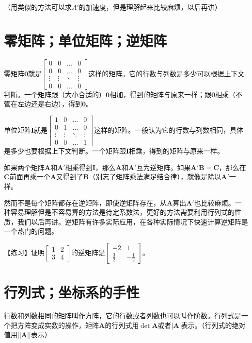 （用类似的方法可以求$A'$的加速度，但是理解起来比较麻烦，以后再讲）
\section{零矩阵；单位矩阵；逆矩阵}
零矩阵$\mathbf{0}$就是$\begin{bmatrix}
0 & 0 & \dots & 0 \\
0 & 0 & \dots & 0 \\
\vdots & \vdots & \ddots & \vdots \\
0 & 0 & \dots & 0
\end{bmatrix}$这样的矩阵。它的行数与列数是多少可以根据上下文判断。一个矩阵跟（大小合适的）$\mathbf{0}$相加，得到的矩阵与原来一样；跟$\mathbf{0}$相乘（不管在左边还是右边），得到$\mathbf{0}$。

单位矩阵$\mathbf{I}$就是$\begin{bmatrix}
1 & 0 & \dots & 0 \\
0 & 1 & \dots & 0 \\
\vdots & \vdots & \ddots & \vdots \\
0 & 0 & \dots & 1
\end{bmatrix}$这样的矩阵。一般认为它的行数与列数相同，具体是多少也要根据上下文判断。一个矩阵跟$\mathbf{I}$相乘，得到的矩阵与原来一样。

如果两个矩阵$\mathbf{A}$和$\mathbf{A'}$相乘得到$\mathbf{I}$，那么$\mathbf{A}$和$\mathbf{A'}$互为逆矩阵。如果$\mathbf{A'} \mathbf{B}=\mathbf{C}$，那么在$\mathbf{C}$前面再乘一个$\mathbf{A}$又得到了$\mathbf{B}$（别忘了矩阵乘法满足结合律），就像是除以$\mathbf{A'}$一样。

然而不是每个矩阵都存在逆矩阵，即使逆矩阵存在，从$\mathbf{A}$算出$\mathbf{A'}$也比较麻烦。一种容易理解但是不容易算的方法是待定系数法，更好的方法需要利用行列式的性质，我们以后再讲。逆矩阵有许多实际应用，在各种实际情况下快速计算逆矩阵是一个热门的问题。

【练习】证明$\begin{bmatrix}
1 & 2 \\
3 & 4
\end{bmatrix}$的逆矩阵是$\begin{bmatrix}
-2 & 1 \\
\frac{3}{2} & -\frac{1}{2}
\end{bmatrix}$。
\section{行列式；坐标系的手性}
行数和列数相同的矩阵叫作方阵，它的行数或者列数也可以叫作阶数。行列式是一个把方阵变成实数的操作，矩阵$\mathbf{A}$的行列式用$\det \mathbf{A}$或者$|\mathbf{A}|$表示。（行列式的绝对值用$||\mathbf{A}||$表示）

